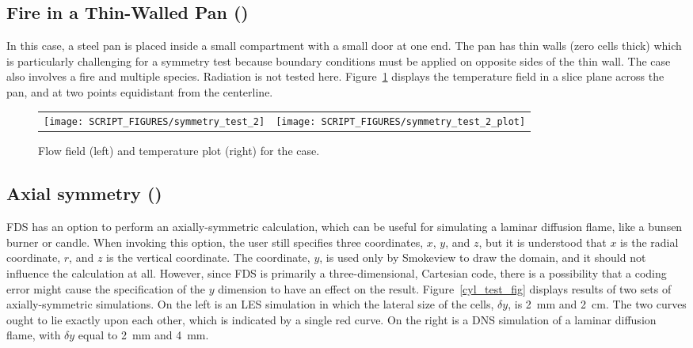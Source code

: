 \documentclass[11pt]{book}
\begin{document}
\subsection{Fire in a Thin-Walled Pan (\texorpdfstring{}{symmetry\_test\_2})}
\label{symmetry_test_2}

In this case, a steel pan is placed inside a small compartment with a small door at one end. The pan has thin walls (zero cells thick) which is particularly challenging for a symmetry test because boundary conditions must be applied on opposite sides of the thin wall. The case also involves a fire and multiple species. Radiation is not tested here. Figure~\ref{symmetry_test_2_fig} displays the temperature field in a slice plane across the pan, and at two points equidistant from the centerline.


\begin{figure}[!ht]
\begin{tabular*}{\textwidth}{lr}
\texttt{[image: SCRIPT\_FIGURES/symmetry\_test\_2]} &
\texttt{[image: SCRIPT\_FIGURES/symmetry\_test\_2\_plot]}
\end{tabular*}
\caption[The  case]{Flow field (left) and temperature plot (right) for the  case.}
\label{symmetry_test_2_fig}
\end{figure}



\subsection{Axial symmetry (\texorpdfstring{}{cyl\_test})}
\label{cyl_test}

FDS has an option to perform an axially-symmetric calculation, which can be useful for simulating a laminar diffusion flame, like a bunsen burner or candle. When invoking this option, the user still specifies three coordinates, $x$, $y$, and $z$, but it is understood that $x$ is the radial coordinate, $r$, and $z$ is the vertical coordinate. The coordinate, $y$, is used only by Smokeview to draw the domain, and it should not influence the calculation at all. However, since FDS is primarily a three-dimensional, Cartesian code, there is a possibility that a coding error might cause the specification of the $y$ dimension to have an effect on the result. Figure~\ref{cyl_test_fig} displays results of two sets of axially-symmetric simulations. On the left is an LES simulation in which the lateral size of the cells, $\delta y$, is 2~mm and 2~cm. The two curves ought to lie exactly upon each other, which is indicated by a single red curve. On the right is a DNS simulation of a laminar diffusion flame, with $\delta y$ equal to 2~mm and 4~mm.
\end{document}
